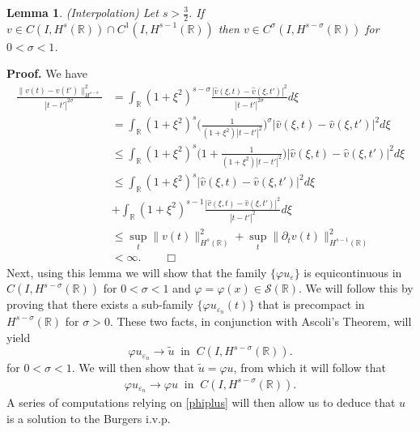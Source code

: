 \documentclass[12pt,reqno]{amsart}
\newcommand{\rr}{\mathbb{R}}
\newcommand{\ee}{\varepsilon}
\newcommand{\vp}{\varphi}
\theoremstyle{plain}  %
\newtheorem{lemma}{Lemma}
\theoremstyle{definition}
\begin{document}
		\begin{lemma}
			\label{interpolation-lem}
			(Interpolation)     Let  $s > \frac{3}{2}$.
			If $v \in C(I, H^s(\rr)) \cap C^1(I, H^{s-1}(\rr))$
			then $v \in C^\sigma (I, H^{s- \sigma}(\rr))$ for  $0 < \sigma < 1$.
		\end{lemma}
		{\bf Proof.}  We have%
		\begin{equation*}
			\begin{split}
				\frac{\|v(t) - v(t')\|^2_{H^{s - \sigma}}}{|t - t'|^{2\sigma}}
				& = 
				\int_{\rr} (1 + \xi^2)^{s- \sigma} 
				\frac{|\hat{v}(\xi, t) - \hat{v}(\xi, t')|^2}{|t-t'|^{2\sigma}} d\xi\\
				& = \int_{\rr} (1+\xi^2)^s 
				\bigg(\frac{1}{(1+ \xi^2)|t - t'|^2} \bigg)^\sigma |\hat{v}(\xi, t)- \hat{v}(\xi, t')|^2 d\xi\\
				& \leq \int_{\rr}(1+\xi^2)^s \bigg( 1 + \frac{1}{(1+\xi^2)|t-t'|^2} \bigg)
				|\hat{v}(\xi,t) - \hat{v}(\xi,t')|^2 d\xi \\
				& \leq \int_{\rr} (1+ \xi^2)^s |\hat{v}(\xi, t)- \hat{v}(\xi, t')|^2 d\xi
				\\
				& + \int_{\rr} (1+ \xi^2)^{s-1} \frac{|\hat{v}(\xi, t) -
				\hat{v} (\xi, t')|^2}{|t-t'|^2} d\xi \\
				& \leq  \sup_t \|v(t)\|_{H^s(\rr)}^2 + \sup_t
				\| \partial_t v(t) \|_{H^{s-1}(\rr)}^2
				\\
				& < \infty. \qquad \Box
			\end{split}
		\end{equation*}
		\vskip0.1in
		Next, using this lemma we will show that the family $\{\varphi u_\ee\}$
		is equicontinuous in $C(I, H^{s-\sigma}(\rr))$ for
		$0 < \sigma < 1$ and $\varphi = \varphi(x) \in \mathcal{S}(\rr)$.
		We will follow this by proving that
		there exists a sub-family $\{\varphi u_{\ee_n}(t)\}$ that is precompact in
		$H^{s-\sigma}(\rr)$ for $\sigma > 0$. 
		These two facts, in conjunction with Ascoli's Theorem, will
		yield
		\begin{equation*}
			\label{strong-conv2}
			\varphi u_{\ee_n} \to \tilde{u}
			\; \; \text{in} \; \; C(I,H^{s-\sigma}(\rr)).
		\end{equation*}
		for $0 < \sigma < 1$.
		We will then show that $\tilde{u} = \varphi u$, from which it will
		follow that
		\begin{equation*}
			\label{phiplus}
			\begin{split}
				\vp u_{\ee_n} \to \vp u
			\; \; \text{in} \; \; C(I,H^{s-\sigma}(\rr)).
			\end{split}
		\end{equation*}
		A series of computations relying on \eqref{phiplus} will then allow us
		to deduce that $u$ is a solution to the Burgers i.v.p.
					
\end{document}
